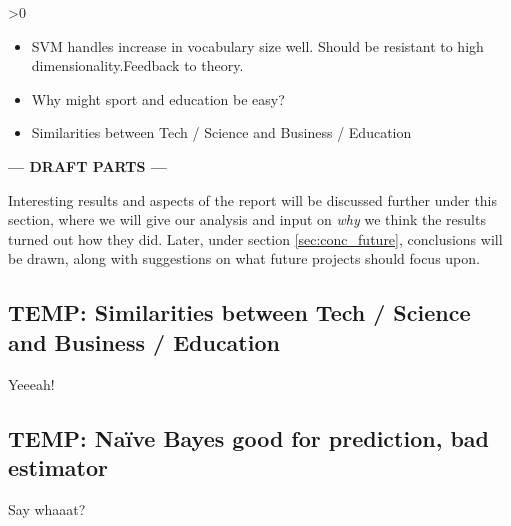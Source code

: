 \ifnum\printdraft>0
	\begin{itemize}
		\item SVM handles increase in vocabulary size well. Should be resistant to high dimensionality.Feedback to theory.
		\item Why might sport and education be easy?
		\item Similarities between Tech / Science and Business / Education
	\end{itemize}
\else
\begin{center}
	\textbf{--- DRAFT PARTS ---}
\end{center}
\fi
Interesting results and aspects of the report will be discussed further under this section, where we will give our analysis and input on \emph{why} we think the results turned out how they did. Later, under section \ref{sec:conc_future}, conclusions will be drawn, along with suggestions on what future projects should focus upon.

\subsection{TEMP: Similarities between Tech / Science and Business / Education} %
\label{sub:temp_similarities_between_tech_science_and_business_education}
Yeeeah!

\subsection{TEMP: Naïve Bayes good for prediction, bad estimator} %
\label{sub:temp_na_ve_bayes_good_for_prediction_bad_estimator}
Say whaaat?

